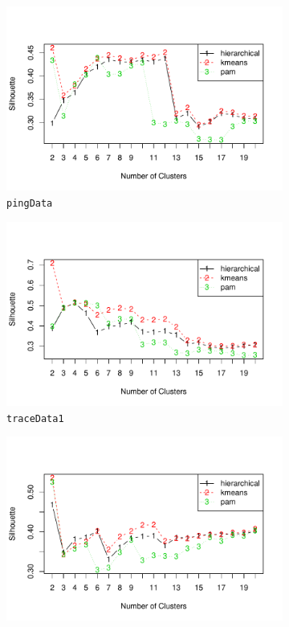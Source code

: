 \begin{figure}[!htb]
    \centering
    \begin{subfigure}[b]{.7\textwidth}
	\centering
	\includegraphics[width=\textwidth]{gfx/chap3/pingSil.pdf}
	\caption{\scriptsize \texttt{pingData}}
	\label{fig:pingSil}
	\end{subfigure}
	\begin{subfigure}[b]{.7\textwidth}
	\centering
	\includegraphics[width=\textwidth]{gfx/chap3/traceSil1.pdf}
	\caption{\scriptsize \texttt{traceData1}}
	\label{fig:traceSil1}
	\end{subfigure}
	\begin{subfigure}[b]{.7\textwidth}
	\centering
	\includegraphics[width=\textwidth]{gfx/chap3/traceSil2.pdf}

\end{subfigure}
\end{figure}
